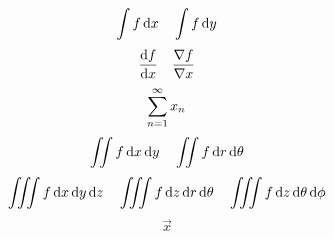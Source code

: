\documentclass{article}
\begin{document}
	\[
		\int f \dx\quad \int f \dd y
	\]
	\[
		\frdt{x}\quad \frpdt{x}
	\]
	\[
		\infseries{n}{1}
	\]
	\[
		\iint f \dxdy\quad \iint f \drdt
	\]
	\[
		\iiint f \dxdydz \quad \iiint f \dzdrdt \quad \iiint f \dzdtdp
	\]
	\[
	\vec{x}
	\]
\end{document}
